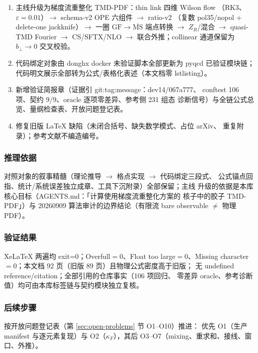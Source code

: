 \documentclass[11pt,a4paper]{ctexart}
\newcommand{\eps}{\varepsilon}
\newcommand{\MSbarM}{\overline{\text{MS}}}
\newcommand{\GFr}{\mathrm{GF}}
\newcommand{\bperp}{b_{\perp}}
\begin{document}
\begin{enumerate}
  \item 主线升级为梯度流重整化 TMD-PDF：thin link 四维 Wilson flow
  （RK3、$\eps=0.01$）$\to$ schema-v2 OPE 六组件 $\to$ ratio-v2
  （复数 pol35/nopol + delete-one jackknife）$\to$ 一圈
  $\GFr\to\MSbarM$ 端点转换 $\to$ $Z_R$/混合 $\to$ quasi-TMD Fourier
  $\to$ CS/SFTX/NLO $\to$ 联合外推；collinear 通道保留为
  $\bperp\to0$ 交叉校验。
  \item 代码绑定对象由 donghx docker 未验证脚本全部更新为 pyqcd
  已验证模块链；代码明文展示全部转为公式/表格化表述（本文档零
  lstlisting）。
  \item 新增验证简报章（证据引 git:tag:message：dev14/067a777、
  conftest 106 项、契约 9/9、oracle 逐项零差异、参考侧 231 组态
  诊断信号）与全链公式总览、量纲检查表、开放问题登记表。
  \item 修复旧版 LaTeX 缺陷（未闭合括号、缺失数学模式、占位 arXiv、
  重复附录）；参考文献不编造编号。
\end{enumerate}

\subsubsection{推理依据}

对照对象的叙事精髓（理论推导 $\to$ 格点实现 $\to$ 代码绑定三段式、
公式锚点回指、统计/系统误差独立成章、工具下沉附录）全部保留；主线
升级的依据是本库核心目标（AGENTS.md：「计算使用梯度流重整化方案的
核子中的胶子 TMD-PDF」）与 20260909 算法审计的边界结论（有限流 bare
observable $\ne$ 物理 PDF）。

\subsubsection{验证结果}

XeLaTeX 两遍均 exit=0；Overfull$=0$、Float too large$=0$、Missing
character$=0$；本文档 92 页（旧版 89 页）且物理公式密度高于旧版；
无 undefined reference/citation；全部引用的仓库事实（106 项回归、
零差异 oracle、参考诊断值）均可由本库标签链与契约模块独立复核。

\subsubsection{后续步骤}

按开放问题登记表（第 \ref{sec:open-problems} 节 O1--O10）推进：
优先 O1（生产 manifest 与逐元素复现）与 O2（$\kappa_F$），其后
O3--O7（mixing、重求和、接线、窗口、外推）。
\end{document}

